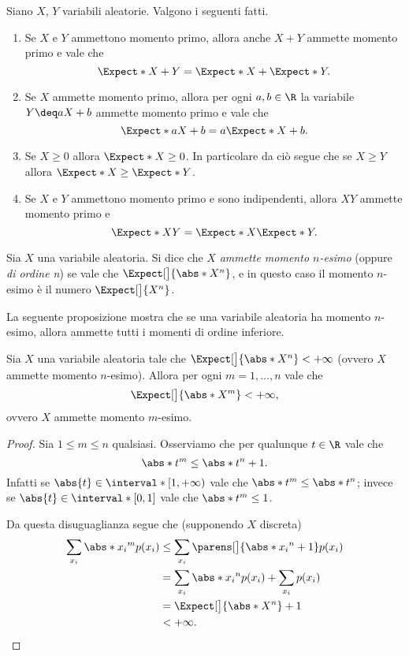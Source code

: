 \begin{proposition}
    \label{prop:prop_expect}
    Siano $X$, $Y$ variabili aleatorie. Valgono i seguenti fatti.
    \begin{enumerate}[label={(\roman*)}]
        \item Se $X$ e $Y$ ammettono momento primo, allora anche $X + Y$ ammette momento primo e vale che \[
            \Expect*{X+ Y} = \Expect*{X} + \Expect*{Y}.    
        \]
        \item Se $X$ ammette momento primo, allora per ogni $a, b \in \R$ la variabile $Y \deq aX + b$ ammette momento primo e vale che \[
            \Expect*{aX + b} = a\Expect*{X} + b.    
        \]
        \item Se $X \geq 0$ allora $\Expect*{X} \geq 0$. In particolare da ciò segue che se $X \geq Y$ allora $\Expect*{X} \geq \Expect*{Y}$.
        \item Se $X$ e $Y$ ammettono momento primo e sono indipendenti, allora $XY$ ammette momento primo e \[
            \Expect*{XY} = \Expect*{X}\Expect*{Y}.    
        \]
    \end{enumerate}
\end{proposition}

\begin{definition}
     Sia $X$ una variabile aleatoria. Si dice che $X$ \emph{ammette momento $n$-esimo} (oppure \emph{di ordine n}) se vale che $\Expect[\big]{\abs*{X^n}}$, e in questo caso il momento $n$-esimo è il numero $\Expect[\big]{X^n}$.
\end{definition}

La seguente proposizione mostra che se una variabile aleatoria ha momento $n$-esimo, allora ammette tutti i momenti di ordine inferiore.

\begin{proposition}
    Sia $X$ una variabile aleatoria tale che $\Expect[\big]{\abs*{X^n}} < +\infty$ (ovvero $X$ ammette momento $n$-esimo). Allora per ogni $m = 1, \dots, n$ vale che \[
        \Expect[\big]{\abs*{X^m}} < +\infty,    
    \] ovvero $X$ ammette momento $m$-esimo.
\end{proposition}
\begin{proof}
    Sia $1 \leq m \leq n$ qualsiasi. Osserviamo che per qualunque $t \in \R$ vale che \[
        \abs*{t}^m \leq \abs*{t}^n + 1.
    \] Infatti se $\abs{t} \in \interval*[{1, +\infty})$ vale che $\abs*{t}^m \leq \abs*{t}^n$; invece se $\abs{t} \in \interval*[{0, 1}]$ vale che $\abs*{t}^m \leq 1$.

    Da questa disuguaglianza segue che (supponendo $X$ discreta) \begin{align*}
        \sum_{x_i} \abs*{x_i}^m p(x_i)
        &\leq \sum_{x_i} \parens[\big]{\abs*{x_i}^n + 1}p(x_i)\\
        &= \sum_{x_i} \abs*{x_i}^np(x_i) + \sum_{x_i} p(x_i)\\
        &= \Expect[\big]{\abs*{X}^n} + 1\\
        &< +\infty. \qedhere
    \end{align*}
\end{proof}

